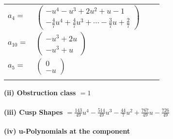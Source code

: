 \documentclass[1p]{elsarticle_modified}
\theoremstyle{definition}
\begin{document}
\begin{tabular}{m{7pt} m{180pt} m{7pt} m{180pt} }
\flushright $a_{4}=$&$\begin{pmatrix}- u^4- u^3+2 u^2+u-1\\-\frac{4}{7} u^4+\frac{4}{7} u^3+\cdots-\frac{3}{7} u+\frac{2}{7}\end{pmatrix}$ \\
\flushright $a_{10}=$&$\begin{pmatrix}- u^3+2 u\\- u^3+u\end{pmatrix}$ \\
\flushright $a_{5}=$&$\begin{pmatrix}0\\- u\end{pmatrix}$\\&\end{tabular}
\flushleft \textbf{(ii) Obstruction class $= 1$}\\~\\
\flushleft \textbf{(iii) Cusp Shapes $= \frac{143}{49} u^4-\frac{514}{49} u^3-\frac{44}{7} u^2+\frac{767}{49} u-\frac{726}{49}$}\\~\\
\newpage\renewcommand{\arraystretch}{1}
\flushleft \textbf{(iv) u-Polynomials at the component}\newline \\
\end{document}
